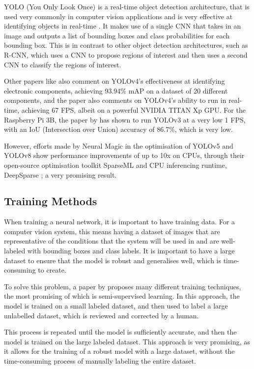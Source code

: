 YOLO (You Only Look Once) is a real-time object detection architecture, that is used very commonly in computer vision applications and is very effective at identifying objects in real-time \citet{yolo}. It makes
use of a single CNN that takes in an image and outputs a list of bounding boxes and class probabilities for each bounding box. This is in contrast to other object detection architectures, such as R-CNN, which uses a CNN to propose regions of interest and then uses a second CNN to classify the regions of interest.

Other papers like \citet{Guo2021} also comment on YOLOv4's effectiveness at identifying electronic components, achieving 93.94\% mAP on a dataset of 20 different components, and the paper also comments
on YOLOv4's ability to run in real-time, achieving 67 FPS, albeit on a powerful NVIDIA TITAN Xp GPU. For the Raspberry Pi 3B, the paper by \citet{9166199} has shown to run YOLOv3 at a very low 1 FPS,
with an IoU (Intersection over Union) accuracy of 86.7\%, which is very low. 

However, efforts made by Neural Magic \cite{neuralmagic} in the optimisation of YOLOv5 and YOLOv8 show performance improvements of up to 10x on CPUs, through their open-source 
optimisation toolkit SparseML \cite{sparseml} and CPU inferencing runtime, DeepSparse \cite{deepsparse}; a very promising result.

\subsection{Training Methods}
When training a neural network, it is important to have training data. For a computer vision system, this means having a dataset of images that are representative of the conditions that the system will be used in and
are well-labeled with bounding boxes and class labels. It is important to have a large dataset to ensure that the model is robust and generalises well, which is time-consuming to create.

To solve this problem, a paper by \citet{Yang_2023} proposes many different training techniques, the most promising of which is semi-supervised learning. In this approach, the model is trained on a small labeled dataset, and then
used to label a large unlabelled dataset, which is reviewed and corrected by a human.

This process is repeated until the model is sufficiently accurate, and then the model is trained on the large labeled dataset. This approach
is very promising, as it allows for the training of a robust model with a large dataset, without the time-consuming process of manually labeling the entire dataset.

